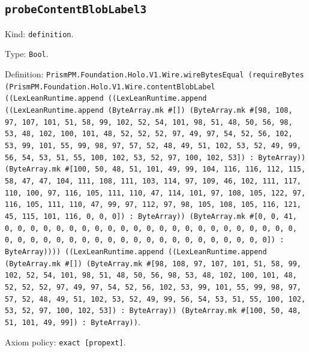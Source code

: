 \documentclass[11pt]{article}
\begin{document}
\subsection*{\texttt{probeContentBlobLabel3}}
\noindent Kind: \texttt{definition}.\par
\noindent Type: \texttt{Bool}.\par
\noindent Definition: \texttt{PrismPM.Foundation.Holo.V1.Wire.wireBytesEqual (requireBytes (PrismPM.Foundation.Holo.V1.Wire.contentBlobLabel ((LexLeanRuntime.append ((LexLeanRuntime.append ((LexLeanRuntime.append (ByteArray.mk \#[]) (ByteArray.mk \#[98, 108, 97, 107, 101, 51, 58, 99, 102, 52, 54, 101, 98, 51, 48, 50, 56, 98, 53, 48, 102, 100, 101, 48, 52, 52, 52, 97, 49, 97, 54, 52, 56, 102, 53, 99, 101, 55, 99, 98, 97, 57, 52, 48, 49, 51, 102, 53, 52, 49, 99, 56, 54, 53, 51, 55, 100, 102, 53, 52, 97, 100, 102, 53]) : ByteArray)) (ByteArray.mk \#[100, 50, 48, 51, 101, 49, 99, 104, 116, 116, 112, 115, 58, 47, 47, 104, 111, 108, 111, 103, 114, 97, 109, 46, 102, 111, 117, 110, 100, 97, 116, 105, 111, 110, 47, 114, 101, 97, 108, 105, 122, 97, 116, 105, 111, 110, 47, 99, 97, 112, 97, 98, 105, 108, 105, 116, 121, 45, 115, 101, 116, 0, 0, 0]) : ByteArray)) (ByteArray.mk \#[0, 0, 41, 0, 0, 0, 0, 0, 0, 0, 0, 0, 0, 0, 0, 0, 0, 0, 0, 0, 0, 0, 0, 0, 0, 0, 0, 0, 0, 0, 0, 0, 0, 0, 0, 0, 0, 0, 0, 0, 0, 0, 0, 0, 0, 0, 0]) : ByteArray)))) ((LexLeanRuntime.append ((LexLeanRuntime.append (ByteArray.mk \#[]) (ByteArray.mk \#[98, 108, 97, 107, 101, 51, 58, 99, 102, 52, 54, 101, 98, 51, 48, 50, 56, 98, 53, 48, 102, 100, 101, 48, 52, 52, 52, 97, 49, 97, 54, 52, 56, 102, 53, 99, 101, 55, 99, 98, 97, 57, 52, 48, 49, 51, 102, 53, 52, 49, 99, 56, 54, 53, 51, 55, 100, 102, 53, 52, 97, 100, 102, 53]) : ByteArray)) (ByteArray.mk \#[100, 50, 48, 51, 101, 49, 99]) : ByteArray))}.\par
\noindent Axiom policy: \texttt{exact [propext]}.\par
\end{document}
